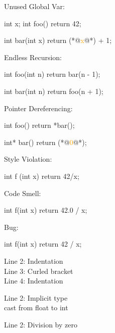 \documentclass{article}
\begin{document}
\begin{pptWide}{3}
Unused Global Var:
{\small\begin{ffcode}
int x;
int foo() {
  return 42;
}

int bar(int x) {
  return (*@\textcolor{orange}{x}@*) + 1;
}
\end{ffcode}
}
\par\columnbreak\par
Endless Recursion:\par
{\small\begin{ffcode}
int foo(int n) {
  return bar(n - 1);
}

int bar(int n) {
  return foo(n + 1);
}
\end{ffcode}
}
\par\columnbreak\par
Pointer Dereferencing:
{\small\begin{ffcode}
int foo() {
  return *bar();
}

int* bar() {
  return (*@\textcolor{orange}{0}@*);
}
\end{ffcode}
}
\end{pptWide}
\plush{}

\begin{multicols}{3}
Style Violation:
{\small\begin{ffcode}
int f
  (int x)
{
     return 42/x;
}
\end{ffcode}
}
\par\columnbreak\par
Code Smell:\par
{\small\begin{ffcode}
int f(int x) {
  return 42.0 / x;
}
\end{ffcode}
}
\par\columnbreak\par
Bug:\par
{\small\begin{ffcode}
int f(int x) {
  return 42 / x;
}
\end{ffcode}
}
\end{multicols}
{\scriptsize\color{red}\ttfamily\begin{multicols}{3}
Line 2: Indentation \\
Line 3: Curled bracket \\
Line 4: Indentation
\par\columnbreak\par
Line 2: Implicit type \\
cast from float to int
\par\columnbreak\par
Line 2: Division by zero
\end{multicols}}
\plush{}
\end{document}
